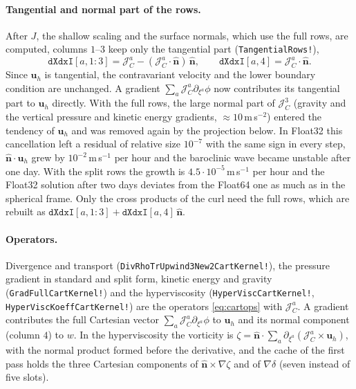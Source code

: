 \documentclass[11pt,a4paper]{article}
\newcommand{\Jm}{\mathcal{J}}
\newcommand{\code}[1]{\texttt{#1}}
\begin{document}
\paragraph{Tangential and normal part of the rows.}
After $J$, the shallow scaling and the surface normals, which use the full
rows, are computed, columns $1$--$3$ keep only the tangential part
(\code{TangentialRows!}),
\begin{equation}
  \code{dXdxI}[a,1{:}3] = \Jm^a_C - (\Jm^a_C\cdot\hat{\bm n})\,\hat{\bm n},
  \qquad \code{dXdxI}[a,4] = \Jm^a_C\cdot\hat{\bm n}.
\end{equation}
Since $\bm u_h$ is tangential, the contravariant velocity and the lower
boundary condition are unchanged. A gradient
$\sum_a\Jm^a_C\partial_{\xi^a}\phi$ now contributes its tangential part to
$\bm u_h$ directly. With the full rows, the large normal part of
$\Jm^3_C$ (gravity and the vertical pressure and kinetic energy gradients,
$\approx 10\,$m\,s$^{-2}$) entered the tendency of $\bm u_h$ and was removed
again by the projection below. In Float32 this cancellation left a residual
of relative size $10^{-7}$ with the same sign in every step, $\hat{\bm n}\cdot\bm u_h$
grew by $10^{-2}\,$m\,s$^{-1}$ per hour and the baroclinic wave became unstable
after one day. With the split rows the growth is $4.5\cdot10^{-5}\,$m\,s$^{-1}$
per hour and the Float32 solution after two days deviates from the Float64 one as
much as in the spherical frame. Only the cross products of the curl need the
full rows, which are rebuilt as $\code{dXdxI}[a,1{:}3] + \code{dXdxI}[a,4]\,\hat{\bm n}$.

\paragraph{Operators.}
Divergence and transport (\code{DivRhoTrUpwind3New2CartKernel!}), the
pressure gradient in standard and split form, kinetic energy and gravity
(\code{GradFullCartKernel!}) and the hyperviscosity
(\code{HyperViscCartKernel!}, \code{HyperViscKoeffCartKernel!}) are the
operators \eqref{eq:cartops} with $\Jm^a_C$. A gradient contributes the full
Cartesian vector $\sum_a\Jm^a_C\partial_{\xi^a}\phi$ to $\bm u_h$ and its
normal component (column $4$) to $w$. In the hyperviscosity the vorticity
is $\zeta = \hat{\bm n}\cdot\sum_a\partial_{\xi^a}(\Jm^a_C\times\bm u_h)$,
with the normal product formed before the derivative, and the cache of the
first pass holds the three Cartesian components of $\hat{\bm n}\times\nabla\zeta$
and of $\nabla\delta$ (seven instead of five slots).
\end{document}
